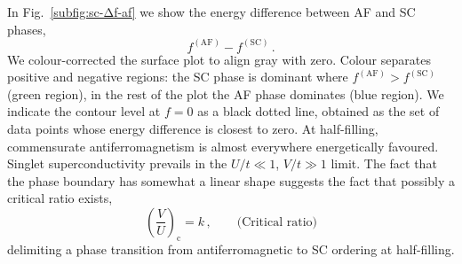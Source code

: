 In Fig.~\ref{subfig:sc-Δf-af} we show the energy difference between AF and SC phases,
\[
	f^{(\mathrm{AF})} - f^{(\mathrm{SC})} \, .
\]
We colour-corrected the surface plot to align gray with zero. Colour separates positive and negative regions: the SC phase is dominant where $f^{(\mathrm{AF})} > f^{(\mathrm{SC})}$ (green region), in the rest of the plot the AF phase dominates (blue region). We indicate the contour level at $f=0$ as a black dotted line, obtained as the set of data points whose energy difference is closest to zero. At half-filling, commensurate antiferromagnetism is almost everywhere energetically favoured. Singlet superconductivity prevails in the $U/t \ll 1$, $V/t \gg 1$ limit. The fact that the phase boundary has somewhat a linear shape suggests the fact that possibly a critical ratio exists,
\[
	\left(\frac{V}{U}\right)_\mathrm{c} = k \, ,
	\qquad
	\text{(Critical ratio)}
\]
delimiting a phase transition from antiferromagnetic to SC ordering at half-filling.
